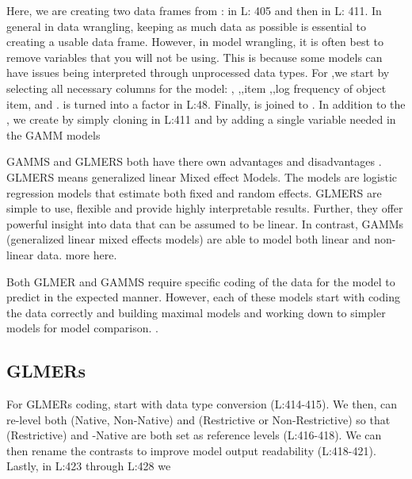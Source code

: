  Here, we are creating two data frames from :  in L: 405 and then  in L: 411. In general in data wrangling, keeping as much data as possible is essential to creating a usable data frame. However, in model wrangling, it is often best to remove variables that you will not be using. This is because some models can have issues being interpreted through unprocessed data types. For ,we start by selecting all necessary columns for the model: , ,,item ,,log frequency of object item, and  .  is turned into a factor in L:48. Finally,  is joined to . In addition to the , we create  by simply cloning  in L:411 and by adding a single variable needed in the GAMM models



GAMMS and GLMERS both have there own advantages and disadvantages \parencite{Ito_Knoeferle_2022}. GLMERS means generalized linear Mixed effect Models. The models are logistic regression models that estimate both fixed and random effects. GLMERS are simple to use, flexible and provide highly interpretable results. Further, they offer powerful insight into data that can be assumed to be linear. In contrast, GAMMs (generalized linear mixed effects models) are able to model both linear and non-linear data. more here.

Both GLMER and GAMMS require specific coding of the data for the model to predict in the expected manner. However, each of these models start with coding the data correctly and building maximal models and working down to simpler models for model comparison. \parencite{max model}.

\subsection{GLMERs}

For GLMERs coding, start with data type conversion (L:414-415). We then, can re-level both (Native, Non-Native) and (Restrictive or Non-Restrictive) so that (Restrictive) and -Native are both set as reference levels (L:416-418).  We can then rename the contrasts to improve model output readability (L:418-421). Lastly, in L:423 through L:428 we 

